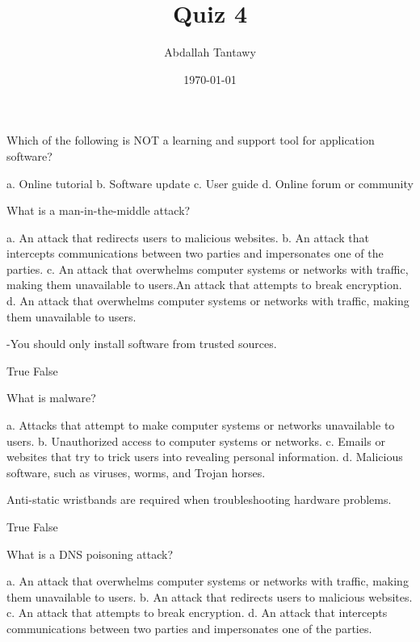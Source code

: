 \documentclass{exam}
\title{Quiz 4}
\author{Abdallah Tantawy}
\date{\today}
\begin{document}
\maketitle

\begin{questions}

\printanswers

\question Which of the following is NOT a learning and support tool for application software?
\begin{checkboxes}
\choice a. Online tutorial
\CorrectChoice b. Software update
\choice c. User guide
\choice d. Online forum or community
\end{checkboxes}

\question What is a man-in-the-middle attack?
\begin{checkboxes}
\choice a. An attack that redirects users to malicious websites.
\CorrectChoice b. An attack that intercepts communications between two parties and impersonates one of the parties.
\choice c. An attack that overwhelms computer systems or networks with traffic, making them unavailable to users.An attack that attempts to break encryption.
\choice d. An attack that overwhelms computer systems or networks with traffic, making them unavailable to users.
\end{checkboxes}

-You should only install software from trusted sources.
\begin{checkboxes}
\CorrectChoice True
\choice False
\end{checkboxes}

\question What is malware?
\begin{checkboxes}
\choice a. Attacks that attempt to make computer systems or networks unavailable to users.
\choice b. Unauthorized access to computer systems or networks.
\choice c. Emails or websites that try to trick users into revealing personal information.
\CorrectChoice d. Malicious software, such as viruses, worms, and Trojan horses.
\end{checkboxes}

\question Anti-static wristbands are required when troubleshooting hardware problems.
\begin{checkboxes}
\choice True
\CorrectChoice False
\end{checkboxes}

\question What is a DNS poisoning attack?
\begin{checkboxes}
\choice a. An attack that overwhelms computer systems or networks with traffic, making them unavailable to users.
\CorrectChoice b. An attack that redirects users to malicious websites.
\choice c. An attack that attempts to break encryption.
\choice d. An attack that intercepts communications between two parties and impersonates one of the parties.
\end{checkboxes}


\end{questions}
\end{document}
